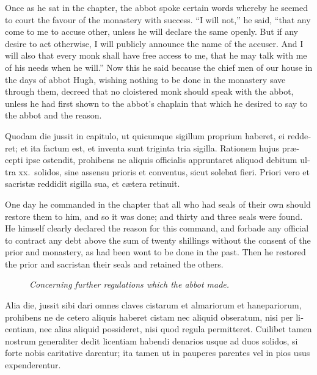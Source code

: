 \documentclass[10pt]{book}
\newcommand{\blockhead}[4][]{
\begin{figure}
\centering
\vspace{#4}
\parbox{2.75cm}{\begin{center}\footnotesize \color{BrickRed} \emph{#2}\\ #1 \end{center}}
\end{figure}
}
\begin{document}
\begin{paracol}{2}
\begin{otherlanguage}{latin}
\end{otherlanguage}

\switchcolumn

Once as he sat in the chapter, the abbot spoke certain words whereby he seemed to court the favour of the monastery with success. ``I will not,'' he said, ``that any come to me to accuse other, unless he will declare the same openly. But if any desire to act otherwise, I will publicly announce the name of the accuser. And I will also that every monk shall have free access to me, that he may talk with me of his needs when he will.'' Now this he said because the chief men of our house in the days of abbot Hugh, wishing nothing to be done in the monastery save through them, decreed that no cloistered monk should speak with the abbot, unless he had first shown to the abbot's chaplain that which he desired to say to the abbot and the reason.

\switchcolumn*

\begin{otherlanguage}{latin}
Quodam die jussit in capitulo, ut quicumque  sigillum proprium haberet, ei redderet; et ita factum est, et inventa sunt triginta tria sigilla. Rationem hujus pr\ae{}cepti ipse ostendit, prohibens ne aliquis officialis appruntaret aliquod debitum ultra xx.\ solidos, sine assensu prioris et conventus, sicut solebat fieri. Priori vero et sacrist\ae{} reddidit sigilla sua, et c\ae{}tera retinuit.
\end{otherlanguage}

\switchcolumn

One day he commanded in the chapter that all who had seals of their own should restore them to him, and so it was done; and thirty and three seals were found. He himself clearly declared the reason for this command, and forbade any official to contract any debt above the sum of twenty shillings without the consent of the prior and monastery, as had been wont to be done in the past. Then he restored the prior and sacristan their seals and retained the others.

\switchcolumn*

\begin{otherlanguage}{latin}
\blockhead{Concerning further regulations which the abbot made.}{4}{-0.45cm}
Alia die, jussit sibi dari omnes claves cistarum et almariorum et hanepariorum, prohibens ne de cetero aliquis haberet cistam nec aliquid obseratum, nisi per licentiam, nec alias aliquid possideret, nisi quod regula permitteret. Cuilibet tamen nostrum generaliter dedit licentiam habendi denarios usque ad duos solidos, si forte nobis caritative darentur; ita tamen ut in pauperes parentes vel in pios usus expenderentur.


\end{otherlanguage}
\end{paracol}
\end{document}
